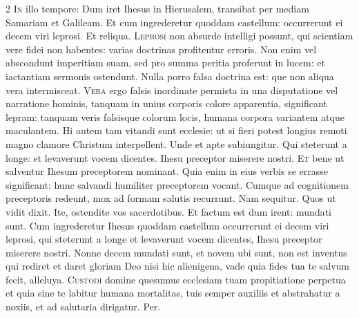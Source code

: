 \begin{multicols*}{2}
\lettrine[lines=2]{\zallmancaps \color{Red} I}{n} illo tempore: Dum iret Ihesus in Hierusalem, transibat per mediam Samariam et Galileam. Et cum ingrederetur quoddam castellum: occurrerunt ei decem viri leprosi. Et reliqua.
\lettrine[lines=2]{\zallmancaps \color{Blue} L}{eprosi} non absurde intelligi possunt, qui scientiam vere fidei non habentes: varias doctrinas profitentur erroris. Non enim vel abscondunt imperitiam suam, sed pro summa peritia proferunt in lucem: et iactantiam sermonis ostendunt. Nulla porro falsa doctrina est: que non aliqua vera intermisceat.
\lettrine[lines=2]{\zallmancaps \color{Red} V}{era} ergo falsis inordinate permista in una disputatione vel narratione hominis, tanquam in unius corporis colore apparentia, significant lepram: tanquam veris falsisque colorum locis, humana corpora variantem atque maculantem. Hi autem tam vitandi sunt ecclesie: ut si fieri potest longius remoti magno clamore Christum interpellent. Unde et apte subiungitur. Qui steterunt a longe: et levaverunt vocem dicentes. Ihesu preceptor miserere nostri.
\lettrine[lines=2]{\zallmancaps \color{Blue} E}{t} bene ut salventur Ihesum preceptorem nominant. Quia enim in eius verbis se errasse significant: hunc salvandi humiliter preceptorem vocant. Cumque ad cognitionem preceptoris redeunt, mox ad formam salutis recurrunt. Nam sequitur. Quos ut vidit dixit. Ite, ostendite vos sacerdotibus. Et factum est dum irent: mundati sunt.
 Cum ingrederetur Ihesus quoddam castellum occurrerunt ei decem viri leprosi, qui steterunt a longe et levaverunt vocem dicentes, Ihesu preceptor miserere nostri.
 Nonne decem mundati sunt, et novem ubi sunt, non est inventus qui rediret et daret gloriam Deo nisi hic alienigena, vade quia fides tua te salvum fecit, alleluya.
\lettrine[lines=2]{\zallmancaps \color{Red} C}{ustodi} domine quesumus ecclesiam tuam propitiatione perpetua et quia sine te labitur humana mortalitas, tuis semper auxiliis et abstrahatur a noxiis, et ad salutaria dirigatur. Per.

\end{multicols*}
